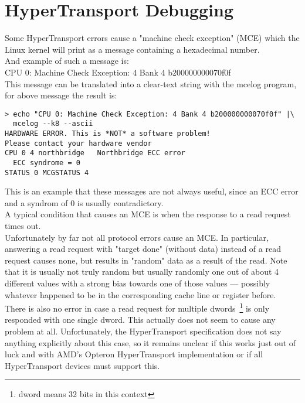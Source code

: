 \chapter{HyperTransport Debugging}
Some HyperTransport errors cause a "machine check exception" (MCE) which
the Linux kernel will print as a message containing a hexadecimal
number.\\
And example of such a message is:\\
CPU 0: Machine Check Exception: 4 Bank 4 b200000000070f0f\\
This message can be translated into a clear-text string
with the mcelog program, for above message the result is:\\
\begin{verbatim}
> echo "CPU 0: Machine Check Exception: 4 Bank 4 b200000000070f0f" |\
  mcelog --k8 --ascii
HARDWARE ERROR. This is *NOT* a software problem!
Please contact your hardware vendor
CPU 0 4 northbridge   Northbridge ECC error
  ECC syndrome = 0
STATUS 0 MCGSTATUS 4
\end{verbatim}
This is an example that these messages are not always useful, since
an ECC error and a syndrom of 0 is usually contradictory.\\
A typical condition that causes an MCE is when the response
to a read request times out.\\
Unfortunately by far not all protocol errors cause an MCE. In particular,
answering a read request with "target done" (without data) instead of
a read request causes none, but results in "random" data as a result
of the read.
Note that it is usually not truly random but usually randomly one out of
about 4 different values with a strong bias towards one of those values
--- possibly whatever happened to be in the corresponding cache line or
register before.\\
There is also no error in case a read request for multiple
dwords~\footnote{dword means 32 bits in this context}
is only responded with one single dword.
This actually does not seem to cause any problem at all.
Unfortunately, the HyperTransport specification does
not say anything explicitly about this case, so it remains unclear if
this works just out of luck and with AMD's Opteron HyperTransport
implementation or if all HyperTransport devices must support this.\\


